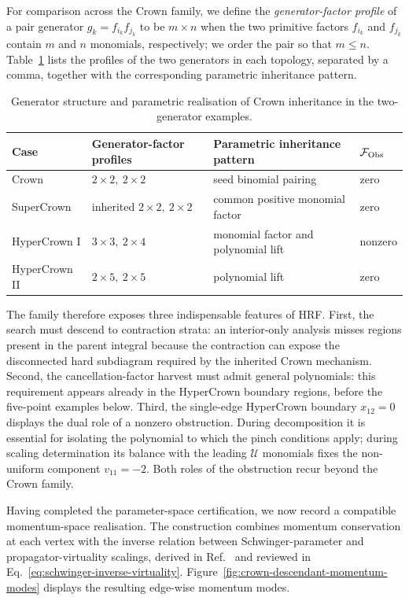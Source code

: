 \documentclass[a4paper,11pt]{article}
\begin{document}
For comparison across the Crown family, we define the
\emph{generator-factor profile} of a pair generator
\(g_k=f_{i_k}f_{j_k}\) to be \(m\mathbin{\times}n\) when the two primitive
factors \(f_{i_k}\) and \(f_{j_k}\) contain \(m\) and \(n\) monomials,
respectively; we order the pair so that \(m\le n\).
Table~\ref{tab:crown-inheritance-patterns} lists the profiles of the two
generators in each topology, separated by a comma, together with the
corresponding parametric inheritance pattern.
\begin{table}[H]
\centering
\small
\begin{tabular}{@{}llll@{}}
\toprule
Case & Generator-factor profiles & Parametric inheritance pattern
& \(\mathcal F_{\rm Obs}\)\\
\midrule
Crown & \(2\mathbin{\times}2,\ 2\mathbin{\times}2\)
& seed binomial pairing & zero\\
SuperCrown & inherited \(2\mathbin{\times}2,\ 2\mathbin{\times}2\)
& common positive monomial factor & zero\\
HyperCrown I & \(3\mathbin{\times}3,\ 2\mathbin{\times}4\)
& monomial factor and polynomial lift & nonzero\\
HyperCrown II & \(2\mathbin{\times}5,\ 2\mathbin{\times}5\)
& polynomial lift & zero\\
\bottomrule
\end{tabular}
\caption{Generator structure and parametric realisation of Crown inheritance
in the two-generator examples.}
\label{tab:crown-inheritance-patterns}
\end{table}

The family therefore exposes three indispensable features of HRF.  First, the
search must descend to contraction strata: an interior-only analysis misses
regions present in the parent integral because the contraction can expose the
disconnected hard subdiagram required by the inherited Crown mechanism.
Second, the cancellation-factor
harvest must admit general polynomials: this requirement appears already in
the HyperCrown boundary regions, before the five-point examples below.
Third, the single-edge HyperCrown boundary \(x_{12}=0\) displays the dual role
of a nonzero obstruction.  During decomposition it is essential for isolating
the polynomial to which the pinch conditions apply; during scaling
determination its balance with the leading \(\mathcal U\) monomials fixes the
non-uniform component \(v_{11}=-2\).  Both roles of the obstruction recur
beyond the Crown family.

Having completed the parameter-space certification, we now record a compatible
momentum-space realisation.
The construction combines momentum conservation at each vertex with the
inverse relation between Schwinger-parameter and propagator-virtuality
scalings, derived in Ref.~\cite[App.~B]{Gardi:2022khw} and reviewed in
Eq.~\eqref{eq:schwinger-inverse-virtuality}.
Figure~\ref{fig:crown-descendant-momentum-modes} displays the resulting
edge-wise momentum modes.
\end{document}
